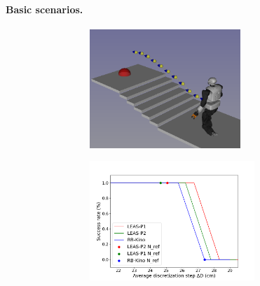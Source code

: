 \paragraph{Basic scenarios.\label{subsub:mip:basic_scenarios}}
\begin{figure}[h!]
    \centering
    \captionsetup[subfigure]{justification=centering}
    \begin{subfigure}{0.9\linewidth}
        \centering
        \begin{subfigure}{0.48\linewidth}
            \includegraphics[trim={0cm 0cm 0cm 0cm},clip,width=\textwidth,height=4.5cm]{Figures/Chapter_MIP_SL1M/res_mip/scenario_stairs.png}
        \end{subfigure}
        \begin{subfigure}{0.48\linewidth}
            \includegraphics[trim={0cm 0cm 2cm 1.8cm}, clip,width=\textwidth,height=4.5cm]{Figures/Chapter_MIP_SL1M/res_mip/MIP_stairs/FIGURE_MIP_STAIRS_2.png}
        \end{subfigure}

\end{subfigure}
\end{figure}
